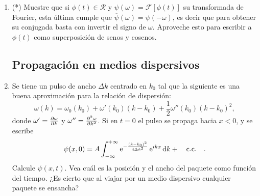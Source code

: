 \documentclass[11pt,spanish,a4paper]{article}
\begin{document}
\begin{enumerate}
\item (*) Muestre que si $\phi(t) \in \mathcal{R}$ y $\psi(\omega)= \mathcal{F} \left[ \phi (t) \right]$ su transformada de Fourier, esta última cumple que \( \overline{\psi}(\omega) = \psi(- \omega) \), es decir que para obtener su conjugada basta con invertir el signo de $\omega$.
	Aproveche esto para escribir a $\phi(t)$ como superposición de senos y cosenos.



\subsection*{Propagación en medios dispersivos}

\item Se tiene un pulso de ancho $\Delta k$ centrado en $k_0$ tal que la siguiente es una buena aproximación para la relación de dispersión:
\[
	\omega(k) = \omega_0 (k_0) + \omega'(k_0) (k - k_0) + \frac{1}{2} \omega'' (k_0) ( k - k_0 )^2,
\]
donde \(\omega'= \pdv{\omega}{k}\) y  \(\omega''= \pdv[2]{\omega}{k}\).
Si en $t=0$ el pulso se propaga hacia $x<0$, y se escribe
\[
	\psi(x,0) = A \int_{-\infty}^{+\infty} \operatorname{e}^{ - \frac{ ( k - k_0 )^2 }{ 4 \Delta k^2 } } \operatorname{e}^{ i k x } \dd{k} + \qq{c.c.}.
\]
Calcule $\psi(x,t)$.
Vea cuál es la posición y el ancho del paquete como función del tiempo.
¿Es cierto que al viajar por un medio dispersivo cualquier paquete se ensancha?





\end{enumerate}
\end{document}
